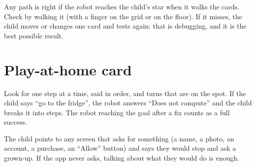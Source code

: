 \begin{answer}
Any path is right if the robot reaches the child's star when it walks the cards. Check by walking it (with a finger on the grid or on the floor). If it misses, the child moves or changes one card and tests again: that is debugging, and it is the best possible result.
\end{answer}

\section{Play-at-home card}
\begin{answer}
Look for one step at a time, said in order, and turns that are on the spot. If the child says \enquote{go to the fridge}, the robot answers \enquote{Does not compute} and the child breaks it into steps. The robot reaching the goal after a fix counts as a full success.
\end{answer}

\begin{answer}
The child points to any screen that asks for something (a name, a photo, an account, a purchase, an \enquote{Allow} button) and says they would stop and ask a grown-up. If the app never asks, talking about what they would do is enough.
\end{answer}
